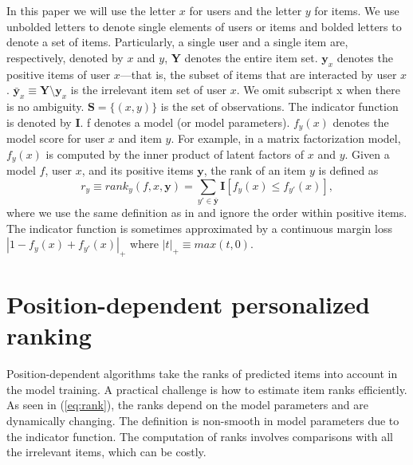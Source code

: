 \documentclass[letterpaper]{article} %
\newcommand{\TODO}[1]{\textcolor{blue}{TODO:~#1}}
\begin{document}
In this paper we will use the letter $x$ for users and the letter $y$ for items. We use unbolded letters to denote single elements of users or items and bolded letters to denote a set of items. Particularly, a single user and a single item are, respectively, denoted by $x$ and $y$, \textbf{Y} denotes the entire item set. $\textbf{y}_x$ denotes the positive items of user $x$---that is, the subset of items that are interacted by user $x$. $\bar{\textbf{y}}_x\equiv\textbf{Y} \setminus \textbf{y}_x$ is the irrelevant item set of user $x$. We omit subscript x when there is no ambiguity. $\textbf{S}=\{(x,y)\}$ is the set of observations. The indicator function is denoted by \textbf{I}. f denotes a model (or model parameters).  $f_y(x)$ denotes the model score for user $x$ and item $y$. For example, in a matrix factorization model, $f_y(x)$ is computed by the inner product of latent factors of $x$ and $y$. Given a model $f$, user $x$, and its positive items $\textbf{y}$, the rank of an item $y$ is defined as
\begin{equation}
\label{eq:rank}
r_y\equiv rank_y(f,x,\textbf{y}) =\sum_{y'\in\bar{\textbf{y}}} \textbf{I}[f_y(x) \le f_{y'}(x)],
\end{equation}
where we use the same definition as in \cite{usunier2009ranking} and ignore the order within positive items. The indicator function is sometimes approximated by a continuous margin loss $|1-f_y(x) + f_{y'}(x)|_+$ where $|t|_+ \equiv max(t,0)$.

\section{Position-dependent personalized ranking}


Position-dependent algorithms take the ranks of predicted items into account in the model training. A practical challenge is how to estimate item ranks efficiently. As seen in (\ref{eq:rank}), the ranks depend on the model parameters and are dynamically changing. The definition is non-smooth in model parameters due to the indicator function. The computation of ranks involves comparisons with all the irrelevant items, which can be costly.
\end{document}
